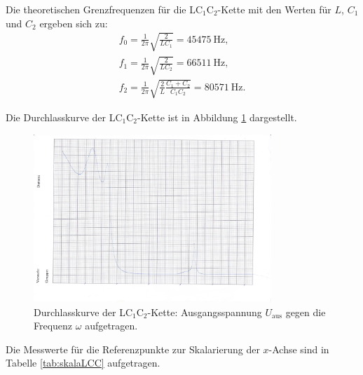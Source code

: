 Die theoretischen Grenzfrequenzen für die LC$_1$C$_2$-Kette mit den Werten für 
$L$, $C_1$ und $C_2$ ergeben sich zu:
\begin{gather*}
	f_0 = \frac{1}{2\pi} \sqrt{\frac{2}{LC_1}} = \SI{45475}{\hertz} \text{,} \\
	f_1 = \frac{1}{2\pi} \sqrt{\frac{2}{LC_2}} = \SI{66511}{\hertz} \text{,} \\
	f_2 = \frac{1}{2\pi} \sqrt{\frac{2}{L} \frac{C_1+C_2}{C_1C_2}} = \SI{80571}{\hertz} \text{.}
\end{gather*}

Die Durchlasskurve der LC$_1$C$_2$-Kette ist in Abbildung \ref{fig:durchiLCC} dargestellt.

\begin{figure}
	\centering
	\includegraphics[width=0.8\textwidth]{Bilder/durchlasskurve_lc1c2.jpg}
	\caption{Durchlasskurve der LC$_1$C$_2$-Kette: Ausgangsspannung $U_{\text{aus}}$ gegen
		die Frequenz $\omega$ aufgetragen.}
	\label{fig:durchiLCC}
\end{figure}

Die Messwerte für die Referenzpunkte zur Skalarierung der $x$-Achse sind in Tabelle
\ref{tab:skalaLCC} aufgetragen.

